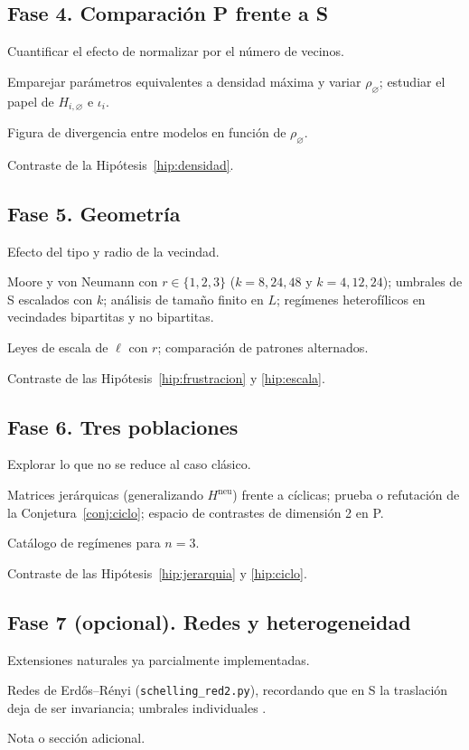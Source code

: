 \documentclass[11pt,a4paper]{article}
\theoremstyle{plain}
\theoremstyle{definition}
\theoremstyle{remark}
\newcommand{\vac}{\varnothing}
\newcommand{\modP}{\textsf{P}}
\newcommand{\modS}{\textsf{S}}
\newenvironment{fase}[1]{\subsection*{#1}\begin{description}[leftmargin=0pt,itemsep=2pt]}{\end{description}}
\begin{document}
\begin{fase}{Fase 4. Comparación \modP{} frente a \modS}
\item[Objetivo.] Cuantificar el efecto de normalizar por el número de vecinos.
\item[Tareas.] Emparejar parámetros equivalentes a densidad máxima y variar
$\rho_\vac$; estudiar el papel de $H_{i,\vac}$ e $\iota_i$.
\item[Entregable.] Figura de divergencia entre modelos en función de
$\rho_\vac$.
\item[Cierre.] Contraste de la Hipótesis~\ref{hip:densidad}.
\end{fase}

\begin{fase}{Fase 5. Geometría}
\item[Objetivo.] Efecto del tipo y radio de la vecindad.
\item[Tareas.] Moore y von Neumann con $r\in\{1,2,3\}$ ($k=8,24,48$ y
$k=4,12,24$); umbrales de \modS{} escalados con $k$; análisis de tamaño finito
en $L$; regímenes heterofílicos en vecindades bipartitas y no bipartitas.
\item[Entregable.] Leyes de escala de $\ell$ con $r$; comparación de patrones
alternados.
\item[Cierre.] Contraste de las Hipótesis~\ref{hip:frustracion} y
\ref{hip:escala}.
\end{fase}

\begin{fase}{Fase 6. Tres poblaciones}
\item[Objetivo.] Explorar lo que no se reduce al caso clásico.
\item[Tareas.] Matrices jerárquicas (generalizando $H^{\mathrm{neu}}$) frente a
cíclicas; prueba o refutación de la Conjetura~\ref{conj:ciclo}; espacio de
contrastes de dimensión 2 en \modP.
\item[Entregable.] Catálogo de regímenes para $n=3$.
\item[Cierre.] Contraste de las Hipótesis~\ref{hip:jerarquia} y
\ref{hip:ciclo}.
\end{fase}

\begin{fase}{Fase 7 (opcional). Redes y heterogeneidad}
\item[Objetivo.] Extensiones naturales ya parcialmente implementadas.
\item[Tareas.] Redes de Erdős--Rényi (\texttt{schelling\_red2.py}), recordando que
en \modS{} la traslación deja de ser invariancia; umbrales individuales
\cite{AcunaGoles2025}.
\item[Entregable.] Nota o sección adicional.
\end{fase}
\end{document}
